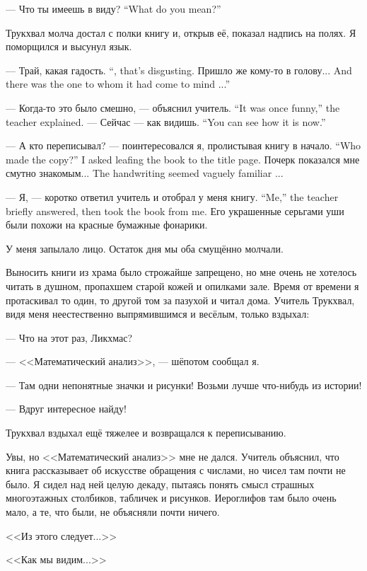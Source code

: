 {--- Что ты имеешь в виду?}
{``What do you mean?''}

Трукхвал молча достал с полки книгу и, открыв её, показал надпись на полях.
Я поморщился и высунул язык.

{--- Трай, какая гадость.}
{``\Trai, that's disgusting.}
{Пришло же кому-то в голову...}
{And there was the one to whom it had come to mind ...''}

{--- Когда-то это было смешно, --- объяснил учитель.}
{``It was once funny,'' the teacher explained.}
{--- Сейчас --- как видишь.}
{``You can see how it is now.''}

{--- А кто переписывал? --- поинтересовался я, пролистывая книгу в начало.}
{``Who made the copy?'' I asked leafing the book to the title page.}
{Почерк показался мне смутно знакомым...}
{The handwriting seemed vaguely familiar ...}

{--- Я, --- коротко ответил учитель и отобрал у меня книгу.}
{``Me,'' the teacher briefly answered, then took the book from me.}
Его украшенные серьгами уши были похожи на красные бумажные фонарики.

У меня запылало лицо.
Остаток дня мы оба смущённо молчали.

Выносить книги из храма было строжайше запрещено, но мне очень не хотелось читать в душном, пропахшем старой кожей и опилками зале.
Время от времени я протаскивал то один, то другой том за пазухой и читал дома.
Учитель Трукхвал, видя меня неестественно выпрямившимся и весёлым, только вздыхал:

--- Что на этот раз, Ликхмас?

--- <<Математический анализ>>, --- шёпотом сообщал я.

--- Там одни непонятные значки и рисунки!
Возьми лучше что-нибудь из истории!

--- Вдруг интересное найду!

Трукхвал вздыхал ещё тяжелее и возвращался к переписыванию.

Увы, но <<Математический анализ>> мне не дался.
Учитель объяснил, что книга рассказывает об искусстве обращения с числами, но чисел там почти не было.
Я сидел над ней целую декаду, пытаясь понять смысл страшных многоэтажных столбиков, табличек и рисунков.
Иероглифов там было очень мало, а те, что были, не объясняли почти ничего.

<<Из этого следует...>>

<<Как мы видим...>>


